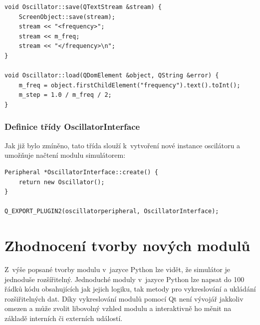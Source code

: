 \begin{lstlisting}
void Oscillator::save(QTextStream &stream) {
	ScreenObject::save(stream);
	stream << "<frequency>";
	stream << m_freq;
	stream << "</frequency>\n";
}

void Oscillator::load(QDomElement &object, QString &error) {
	m_freq = object.firstChildElement("frequency").text().toInt();
	m_step = 1.0 / m_freq / 2;
}
\end{lstlisting}

\subsubsection{Definice třídy OscillatorInterface}

Jak již bylo zmíněno, tato třída slouží k~vytvoření nové instance oscilátoru a umožňuje načtení modulu simulátorem:

\begin{lstlisting}
Peripheral *OscillatorInterface::create() {
	return new Oscillator();
}

Q_EXPORT_PLUGIN2(oscillatorperipheral, OscillatorInterface);
\end{lstlisting}

\section{Zhodnocení tvorby nových modulů}
Z~výše popsané tvorby modulu v~jazyce Python lze vidět, že simulátor je jednoduše rozšířitelný. Jednoduché moduly v~jazyce Python lze napsat do 100 řádků kódu obsahujících jak jejich logiku, tak metody pro vykreslování a ukládání rozšiřitelných dat. Díky vykreslování modulů pomocí Qt není vývojář jakkoliv omezen a může zvolit libovolný vzhled modulu a interaktivně ho měnit na základě interních či externích událostí.

